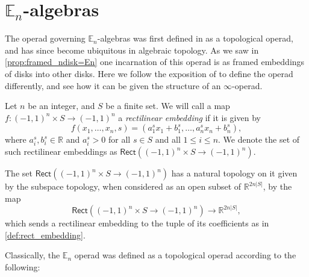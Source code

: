 \documentclass[../text]{subfiles}
\begin{document}
\section{\texorpdfstring{$\mathbb{E}_n$}{En}-algebras}\label{app:En_algebras}

The operad governing $\mathbb{E}_n$-algebras was first defined in \cite{bv73} as a topological operad, and has since become ubiquitous in algebraic topology. As we saw in \cref{prop:framed_ndisk=En} one incarnation of this operad is as framed embeddings of disks into other disks. Here we follow the exposition of \cite[sec.5.1]{lurie_ha} to define the operad differently, and see how it can be given the structure of an $\infty$-operad.

\begin{definition}\label{def:rect_embedding}
    Let $n$ be an integer, and $S$ be a finite set. We will call a map $f:(-1,1)^n \times S \rightarrow (-1,1)^n$ a \emph{rectilinear embedding} if it is given by
    \begin{equation}
        f(x_1, \dots, x_n, s) = (a^s_1 x_1 + b^s_1, \dots, a^s_n x_n + b^s_n),
    \end{equation}
    where $a^s_i, b^s_i \in \mathbb{R}$ and $a^s_i > 0$ for all $s \in S$ and all $1 \leq i \leq n$. We denote the set of such rectilinear embeddings as $\mathsf{Rect}((-1,1)^n \times S \rightarrow (-1,1)^n)$.
\end{definition}

\begin{remark}
    The set $\mathsf{Rect}((-1,1)^n \times S \rightarrow (-1,1)^n)$ has a natural topology on it given by the subspace topology, when considered as an open subset of $\mathbb{R}^{2n |S|}$, by the map
    \begin{equation}
        \mathsf{Rect}((-1,1)^n \times S \rightarrow (-1,1)^n) \xrightarrow{\quad} \mathbb{R}^{2n |S|},
    \end{equation}
    which sends a rectilinear embedding to the tuple of its coefficients as in \cref{def:rect_embedding}.
\end{remark}

Classically, the $\mathbb{E}_n$ operad was defined as a topological operad according to the following:
\end{document}
